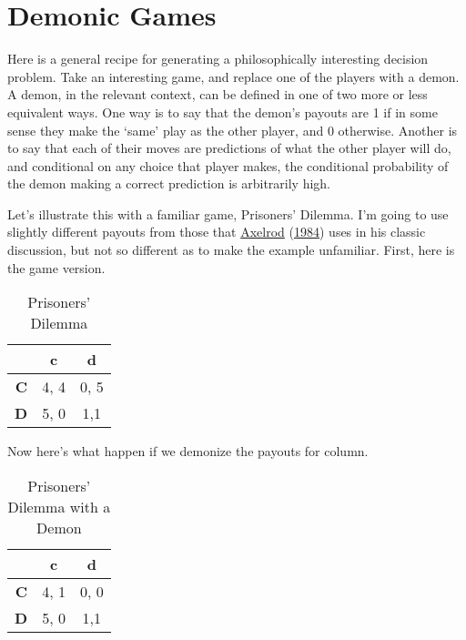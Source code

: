 \documentclass[
  12pt,
]{article}
\begin{document}
\hypertarget{demonic-games}{%
\section{Demonic Games}\label{demonic-games}}

Here is a general recipe for generating a philosophically interesting
decision problem. Take an interesting game, and replace one of the
players with a demon. A demon, in the relevant context, can be defined
in one of two more or less equivalent ways. One way is to say that the
demon's payouts are 1 if in some sense they make the `same' play as the
other player, and 0 otherwise. Another is to say that each of their
moves are predictions of what the other player will do, and conditional
on any choice that player makes, the conditional probability of the
demon making a correct prediction is arbitrarily high.

Let's illustrate this with a familiar game, Prisoners' Dilemma. I'm
going to use slightly different payouts from those that
\protect\hyperlink{ref-Axelrod1984}{Axelrod}
(\protect\hyperlink{ref-Axelrod1984}{1984}) uses in his classic
discussion, but not so different as to make the example unfamiliar.
First, here is the game version.

\begin{table}[H]

\caption{\label{tab:unnamed-chunk-4}Prisoners' Dilemma}
\centering
\begin{tabular}[t]{>{}r|cc}

\textbf{} & \textbf{c} & \textbf{d}\\
\midrule
\textbf{C} & 4, 4 & 0, 5\\
\textbf{D} & 5, 0 & 1,1\\

\end{tabular}
\end{table}

Now here's what happen if we demonize the payouts for column.

\begin{table}[H]

\caption{\label{tab:unnamed-chunk-5}Prisoners' Dilemma with a Demon}
\centering
\begin{tabular}[t]{>{}r|cc}

\textbf{} & \textbf{c} & \textbf{d}\\
\midrule
\textbf{C} & 4, 1 & 0, 0\\
\textbf{D} & 5, 0 & 1,1\\

\end{tabular}
\end{table}
\end{document}
